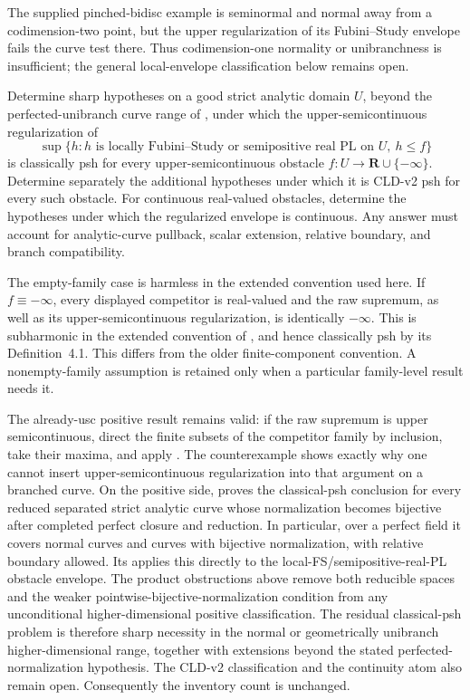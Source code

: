 The supplied pinched-bidisc example
 is seminormal and normal
away from a codimension-two point, but the upper regularization of its
Fubini--Study envelope fails the curve test there. Thus codimension-one
normality or unibranchness is insufficient; the general local-envelope
classification below remains open.

\begin{problem}\label{prob:frontier-unibranch-local-envelope}
Determine sharp hypotheses on a good strict analytic domain \(U\), beyond
the perfected-unibranch curve range of
, under which the
upper-semicontinuous regularization of
\[
 \sup\{h:h\text{ is locally Fubini--Study or semipositive real PL on }U,
              \ h\leq f\}
\]
is classically psh for every upper-semicontinuous obstacle
\(f:U\to\mathbf R\cup\{-\infty\}\).  Determine separately the additional
hypotheses under which it is CLD-v2 psh for every such obstacle.  For
continuous real-valued obstacles, determine the hypotheses under which the
regularized envelope is continuous.  Any answer must account for
analytic-curve pullback, scalar extension, relative boundary, and branch
compatibility.
\end{problem}

The empty-family case is harmless in the extended convention used here.  If
\(f\equiv-\infty\), every displayed competitor is real-valued and the raw
supremum, as well as its upper-semicontinuous regularization, is identically
\(-\infty\).  This is subharmonic in the extended convention of
\cite[Definition~3.4 and \S3.4.1]{GR25Classical}, and hence classically psh
by its Definition~4.1.  This differs from the older finite-component
convention.  A nonempty-family assumption is retained only when a particular
family-level result needs it.

The already-usc positive result remains valid: if the raw supremum is upper
semicontinuous, direct the finite subsets of the competitor family by
inclusion, take their maxima, and apply
\cite[Theorem~6.5]{GR25Classical}.  The counterexample shows exactly why one
cannot insert upper-semicontinuous regularization into that argument on a
branched curve.  On the positive side,
 proves the classical-psh
conclusion for every reduced separated strict analytic curve whose
normalization becomes bijective after completed perfect closure and
reduction.  In particular, over a perfect field it covers normal curves and
curves with bijective normalization, with relative boundary allowed.  Its
 applies this directly
to the local-FS/semipositive-real-PL obstacle envelope.  The product
obstructions above remove both reducible spaces and the weaker
pointwise-bijective-normalization condition from any unconditional
higher-dimensional positive classification.  The residual classical-psh
problem is therefore sharp necessity in the normal or geometrically
unibranch higher-dimensional range, together with extensions beyond the
stated perfected-normalization hypothesis.  The CLD-v2 classification and
the continuity atom also remain open.  Consequently the inventory count is
unchanged.

